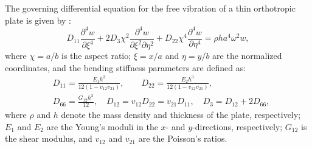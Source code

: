 \documentclass[preprint,12pt]{elsarticle}
\begin{document}
The governing differential equation for the free vibration of a thin orthotropic plate is given by \citep{xing2020improved}:  
%
\begin{equation}\label{eq:governing_EOM}
	D_{11}\frac{\partial^4w}{\partial \xi^4} + 2D_3\chi^2\frac{\partial^4w}{\partial \xi^2 \partial \eta^2} + D_{22}\chi^4\frac{\partial^4w}{\partial \eta^4} = \rho ha^4\omega^2w,
\end{equation}
%
where $ \chi = a / b $ is the aspect ratio; $ \xi = x / a $ and $ \eta = y / b $ are the normalized coordinates, and the bending stiffness parameters are defined as:
%
\begin{equation}\label{eq:bd_stiff}
	\begin{split}
		&D_{11} = \frac{E_1h^3}{12(1-v_{12}v_{21})}, \qquad D_{22} = \frac{E_2h^3}{12(1-v_{12}v_{21})}, \\  
		&D_{66} = \frac{G_{12}h^3}{12}, \quad D_{12} = v_{12}D_{22} = v_{21}D_{11}, \quad D_3 = D_{12} + 2D_{66},
	\end{split}
\end{equation}
%
where $\rho$ and $h$ denote the mass density and thickness of the plate, respectively; $E_1$ and $E_2$ are the Young’s moduli in the $x$- and $y$-directions, respectively; $G_{12}$ is the shear modulus, and $v_{12}$ and $v_{21}$ are the Poisson’s ratios.
\end{document}
